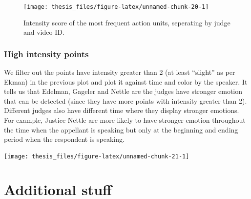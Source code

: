 \documentclass{monashthesis}
\begin{document}
\begin{figure}
\texttt{[image: thesis\_files/figure-latex/unnamed-chunk-20-1]} \caption{Intensity score of the most frequent action units, seperating by judge and video ID.\label{fig:intensity_by_au}}\label{fig:unnamed-chunk-20}
\end{figure}

\hypertarget{high-intensity-points}{%
\subsection{High intensity points}\label{high-intensity-points}}

We filter out the points have intensity greater than 2 (at least ``slight'' as per Ekman) in the previous plot and plot it against time and color by the speaker. It tells us that Edelman, Gageler and Nettle are the judges have stronger emotion that can be detected (since they have more points with intensity greater than 2). Different judges also have different time where they display stronger emotions. For example, Justice Nettle are more likely to have stronger emotion throughout the time when the appellant is speaking but only at the beginning and ending period when the respondent is speaking.

\texttt{[image: thesis\_files/figure-latex/unnamed-chunk-21-1]}

\appendix

\hypertarget{additional-stuff}{%
\chapter{Additional stuff}\label{additional-stuff}}
\end{document}
